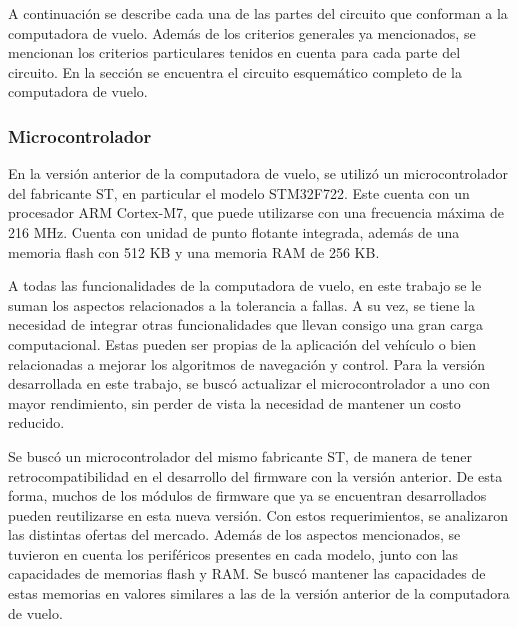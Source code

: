 A continuación se describe cada una de las partes del circuito que conforman a la computadora de vuelo. Además de los criterios generales ya mencionados, se mencionan los criterios particulares tenidos en cuenta para cada parte del circuito. En la sección  se encuentra el circuito esquemático completo de la computadora de vuelo.

\subsubsection{Microcontrolador}



En la versión anterior de la computadora de vuelo, se utilizó un microcontrolador del fabricante ST, en particular el modelo STM32F722. Este cuenta con un procesador ARM Cortex-M7, que puede utilizarse con una frecuencia máxima de 216 MHz. Cuenta con unidad de punto flotante integrada, además de una memoria flash con 512 KB y una memoria RAM de 256 KB.

A todas las funcionalidades de la computadora de vuelo, en este trabajo se le suman los aspectos relacionados a la tolerancia a fallas. A su vez, se tiene la necesidad de integrar otras funcionalidades que llevan consigo una gran carga computacional. Estas pueden ser propias de la aplicación del vehículo o bien relacionadas a mejorar los algoritmos de navegación y control. Para la versión desarrollada en este trabajo, se buscó actualizar el microcontrolador a uno con mayor rendimiento, sin perder de vista la necesidad de mantener un costo reducido.

Se buscó un microcontrolador del mismo fabricante ST, de manera de tener retrocompatibilidad en el desarrollo del firmware con la versión anterior. De esta forma, muchos de los módulos de firmware que ya se encuentran desarrollados pueden reutilizarse en esta nueva versión. Con estos requerimientos, se analizaron las distintas ofertas del mercado. Además de los aspectos mencionados, se tuvieron en cuenta los periféricos presentes en cada modelo, junto con las capacidades de memorias flash y RAM. Se buscó mantener las capacidades de estas memorias en valores similares a las de la versión anterior de la computadora de vuelo.

